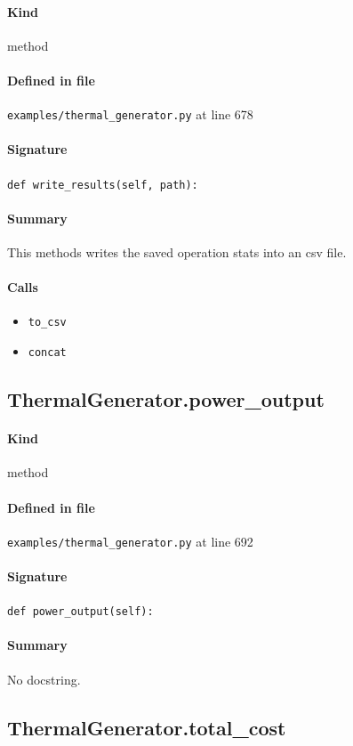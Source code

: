 \documentclass[11pt]{report}
\begin{document}
\paragraph{Kind} method
\paragraph{Defined in file} \texttt{examples/thermal\_generator.py} at line 678
\paragraph{Signature} \texttt{def write\_results(self, path):}
\paragraph{Summary} This methods writes the saved operation stats into an csv file.
\paragraph{Calls}
\begin{itemize}[leftmargin=*]
  \item \texttt{to\_csv}
  \item \texttt{concat}
\end{itemize}
\subsection{ThermalGenerator.power\_output}
\label{def:examples-thermal_generator.py:ThermalGenerator.power_output:L692}
\paragraph{Kind} method
\paragraph{Defined in file} \texttt{examples/thermal\_generator.py} at line 692
\paragraph{Signature} \texttt{def power\_output(self):}
\paragraph{Summary} No docstring.
\subsection{ThermalGenerator.total\_cost}
\label{def:examples-thermal_generator.py:ThermalGenerator.total_cost:L696}
\end{document}
